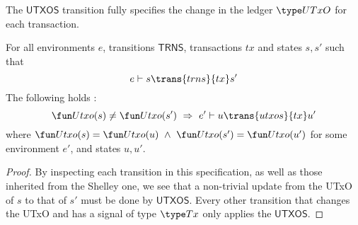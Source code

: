 \begin{property}
  \label{prop:utxo-change}

The $\mathsf{UTXOS}$ transition fully specifies the change in the ledger $\UTxO$
for each transaction.

\begin{lemma}
  For all environments $e$, transitions $\mathsf{TRNS}$, transactions $tx$ and states $s, s'$ such that
  \begin{equation*}
    e\vdash s\trans{trns}{tx}s'
  \end{equation*}
  The following holds :
  \begin{equation*}
    \Utxo(s) \neq \Utxo(s')~\Rightarrow~e'\vdash u\trans{utxos}{tx}u'
  \end{equation*}
  where $\Utxo(s) = \Utxo(u)~\wedge~\Utxo(s') = \Utxo(u')$ for some environment $e'$,
  and states $u, u'$.
\end{lemma}
\begin{proof}
  By inspecting each transition in this specification, as well as those inherited from the
    Shelley one, we see that a non-trivial update from the UTxO of $s$ to that of $s'$
    must be done by $\mathsf{UTXOS}$. Every other transition that changes the UTxO and
    has a signal of type $\Tx$ only applies the $\mathsf{UTXOS}$.
\end{proof}
\end{property}

